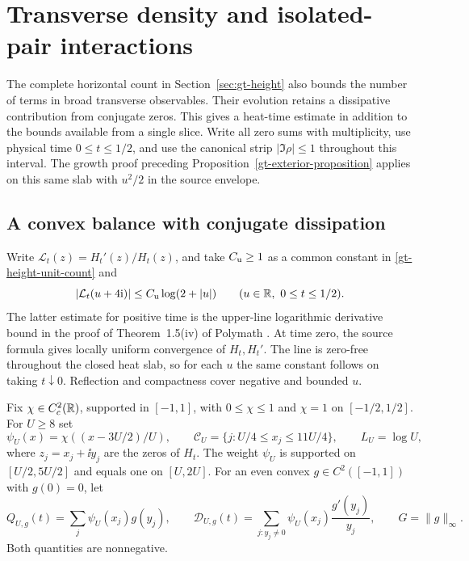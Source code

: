 \section{Transverse density and isolated-pair interactions}
\label{sec:gt-transverse}

The complete horizontal count in Section~\ref{sec:gt-height} also bounds
the number of terms in broad transverse observables. Their evolution
retains a dissipative contribution from conjugate zeros. This gives
a heat-time estimate in addition to the bounds available from a single
slice. Write all zero sums with multiplicity, use physical time
\(0\le t\le1/2\), and use the canonical strip \(|\Im\rho|\le1\)
throughout this interval.
The growth proof preceding Proposition~\ref{gt-exterior-proposition}
applies on this same slab with \(u^2/2\) in the source envelope.

\subsection{A convex balance with conjugate dissipation}

Write \(\mathcal L_t(z)=H_t'(z)/H_t(z)\), and take \(C_{\rm u}\ge1\)
as a common constant in \eqref{gt-height-unit-count} and
\begin{equation}
 |\mathcal L_t(u+4\mathrm i)|\le C_{\rm u}\log(2+|u|)
 \qquad(u\in\mathbb R,\ 0\le t\le1/2).
 \label{gt-safe-line}
\end{equation}
The latter estimate for positive time is the upper-line logarithmic
derivative bound in the proof of Theorem~1.5(iv) of Polymath
\cite[\S9, following (105), using Proposition~9.1(ii)]{polymath}.
At time zero, the source formula gives locally uniform convergence of
\(H_t,H_t'\). The line is zero-free throughout the closed heat slab,
so for each \(u\) the same constant follows on taking \(t\downarrow0\).
Reflection and compactness cover negative and bounded \(u\).

Fix \(\chi\in C_c^2(\mathbb R)\), supported in \([-1,1]\), with
\(0\le\chi\le1\) and \(\chi=1\) on \([-1/2,1/2]\). For \(U\ge8\) set
\[
 \psi_U(x)=\chi((x-3U/2)/U),\qquad
 \mathcal C_U=\{j:U/4\le x_j\le11U/4\},\qquad L_U=\log U,
\]
where \(z_j=x_j+\ii y_j\) are the zeros of \(H_t\). The weight
\(\psi_U\) is supported on \([U/2,5U/2]\) and equals one on \([U,2U]\).
For an even convex \(g\in C^2([-1,1])\) with \(g(0)=0\), let
\[
 Q_{U,g}(t)=\sum_j\psi_U(x_j)g(y_j),\qquad
 \mathcal D_{U,g}(t)=\sum_{j:y_j\ne0}\psi_U(x_j)\frac{g'(y_j)}{y_j},
 \qquad G=\|g\|_\infty .
\]
Both quantities are nonnegative.

